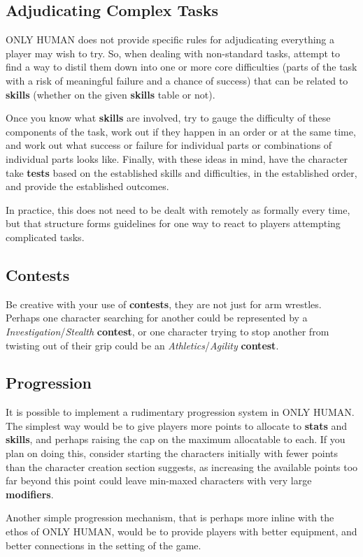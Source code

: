 \documentclass[11pt]{article}
\begin{document}
\begin{multicols}{3}
  \subsection*{Adjudicating Complex Tasks}

  ONLY HUMAN does not provide specific rules for adjudicating everything a
  player may wish to try. So, when dealing with non-standard tasks, attempt to
  find a way to distil them down into one or more core difficulties (parts of
  the task with a risk of meaningful failure and a chance of success) that can
  be related to \textbf{skills} (whether on the given \textbf{skills} table or
  not).

  Once you know what \textbf{skills} are involved, try to gauge the difficulty
  of these components of the task, work out if they happen in an order or at the
  same time, and work out what success or failure for individual parts or
  combinations of individual parts looks like. Finally, with these ideas in
  mind, have the character take \textbf{tests} based on the established skills
  and difficulties, in the established order, and provide the established
  outcomes.

  In practice, this does not need to be dealt with remotely as formally every
  time, but that structure forms guidelines for one way to react to players
  attempting complicated tasks.

  \subsection*{Contests}

  Be creative with your use of \textbf{contests}, they are not just for arm
  wrestles. Perhaps one character searching for another could be represented by
  a \textit{Investigation}/\textit{Stealth} \textbf{contest}, or one character
  trying to stop another from twisting out of their grip could be an
  \textit{Athletics}/\textit{Agility} \textbf{contest}.

  \subsection*{Progression}

  It is possible to implement a rudimentary progression system in ONLY HUMAN.
  The simplest way would be to give players more points to allocate to
  \textbf{stats} and \textbf{skills}, and perhaps raising the cap on the maximum
  allocatable to each. If you plan on doing this, consider starting the 
characters initially with fewer points than the character creation section
suggests, as increasing the available points too far beyond this point could
leave min-maxed characters with very large \textbf{modifiers}.

  Another simple progression mechanism, that is perhaps more inline with the
  ethos of ONLY HUMAN, would be to provide players with better equipment, and
  better connections in the setting of the game.

\end{multicols}
\end{document}
